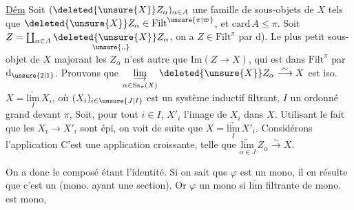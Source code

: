\uline{Dém} Soit $(\deleted{\unsure{X}}Z_\alpha)_{\alpha\in A}$ une famille de sous-objets
de $X$ tels que $\deleted{\unsure{X}}Z_\alpha\in\mathrm{Filt}^{\unsure{\pi|\varpi}}$, et $\mathrm{card}\,A\leq\pi$.
Soit $Z=\coprod_{\alpha\in A}\underset{\unsure{,,}}{\deleted{\unsure{X}}Z_\alpha}$, on a $Z\in\mathrm{Filt}^{\pi}$ par d).
Le plus petit sous-objet de $X$ majorant les
$Z_\alpha$ n'est autre que $\mathrm{Im}(Z\to X)$, qui
est dans $\mathrm{Filt}^{\pi}$ par $\mathrm d_{\unsure{2|1}}$. Prouvons que
$\underset{\alpha\in\mathrm{Ss}_{\pi}(X)}{\underrightarrow{\mathrm{lim}}}\,\deleted{\unsure{X}}Z_{\alpha}\overset{\sim}{\longrightarrow}X$ est iso.  
 $X=\underset{I}{\underrightarrow{\mathrm{lim}}}\,X_i$, où $(X_i)_{i\in\unsure{J|I}}$ est
un système inductif filtrant, $I$ un
ordonné grand devant $\pi$,  Soit, pour tout
$i\in I$, $X'_i$ l'image de $X_i$ dans $X$.
Utilisant le fait que les $X_i\to X'_i$ sont
épi, on voit de suite que $X=\underset{I}{\underrightarrow{\mathrm{lim}}}\,X'_i$.
Considérons l'application
C'est une application croissante,   telle
 que $\underset{\alpha\in J}{\underrightarrow{\mathrm{lim}}}\,Z_\alpha\overset{\sim}{\longrightarrow}X$.


On a donc
le composé étant l'identité. Si on sait
que $\varphi$ est un mono, il en résulte
que c'est un  (mono. ayant
une section).  Or $\varphi$  un
mono si  $\underrightarrow{\mathrm{lim}}$\unsure{;|:} filtrante de
mono. est mono, 

